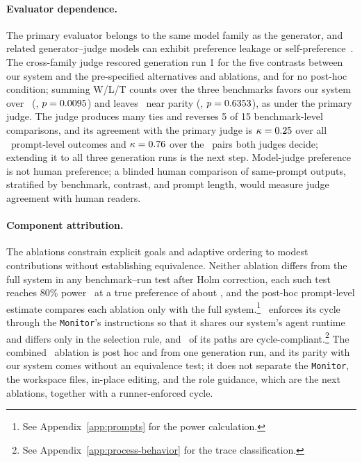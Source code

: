 \paragraph{Evaluator dependence.}
The primary evaluator belongs to the same model family as the generator, and related generator--judge models can exhibit preference leakage or self-preference~\citep{li2026preference,panickssery2024selfpreference}.
The cross-family judge rescored generation run 1 for the five contrasts between our system and the pre-specified alternatives and ablations, and for no post-hoc condition; summing W/L/T counts over the three benchmarks favors our system over \condStaged\ (\CrossFamilyFullStagedWinRate, $p=0.0095$) and leaves \condFixedOrder\ near parity (\CrossFamilyFullFixedOrderWinRate, $p=0.6353$), as under the primary judge.
The judge produces many ties and reverses 5 of 15 benchmark-level comparisons, and its agreement with the primary judge is $\kappa=0.25$ over all \JudgeAgreementPairs\ prompt-level outcomes and $\kappa=0.76$ over the \JudgeAgreementDecidedPairs\ pairs both judges decide; extending it to all three generation runs is the next step.
Model-judge preference is not human preference; a blinded human comparison of same-prompt outputs, stratified by benchmark, contrast, and prompt length, would measure judge agreement with human readers.

\paragraph{Component attribution.}
The ablations constrain explicit goals and adaptive ordering to modest contributions without establishing equivalence.
Neither ablation differs from the full system in any benchmark--run test after Holm correction, each such test reaches 80\% power~\citep{card2020little} at a true preference of about \PowerCellDetectablePreference, and the post-hoc prompt-level estimate compares each ablation only with the full system.\footnote{See Appendix~\ref{app:prompts} for the power calculation.}
\condFixedOrder\ enforces its cycle through the \texttt{Monitor}'s instructions so that it shares our system's agent runtime and differs only in the selection rule, and \AsixCycleCompliantRate\ of its paths are cycle-compliant.\footnote{See Appendix~\ref{app:process-behavior} for the trace classification.}
The combined \condLoopOnly\ ablation is post hoc and from one generation run, and its parity with our system comes without an equivalence test; it does not separate the \texttt{Monitor}, the workspace files, in-place editing, and the role guidance, which are the next ablations, together with a runner-enforced cycle.

